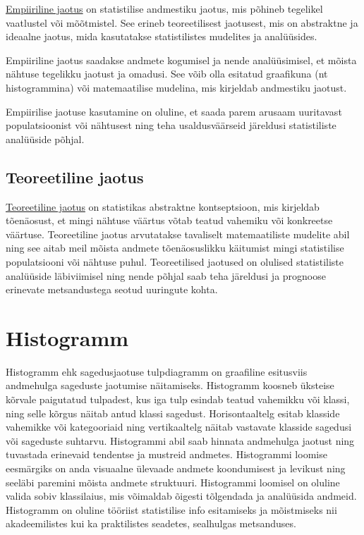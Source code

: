 \documentclass[
]{book}
\begin{document}
\href{https://sonaveeb.ee/search/unif/dlall/aso/empiiriline\%20jaotus/1/est}{Empiiriline jaotus} on statistilise andmestiku jaotus, mis põhineb tegelikel vaatlustel või mõõtmistel. See erineb teoreetilisest jaotusest, mis on abstraktne ja ideaalne jaotus, mida kasutatakse statistilistes mudelites ja analüüsides.

Empiiriline jaotus saadakse andmete kogumisel ja nende analüüsimisel, et mõista nähtuse tegelikku jaotust ja omadusi. See võib olla esitatud graafikuna (nt histogrammina) või matemaatilise mudelina, mis kirjeldab andmestiku jaotust.

Empiirilise jaotuse kasutamine on oluline, et saada parem arusaam uuritavast populatsioonist või nähtusest ning teha usaldusväärseid järeldusi statistiliste analüüside põhjal.

\subsection{Teoreetiline jaotus}\label{teoreetiline-jaotus}

\href{https://sonaveeb.ee/search/unif/dlall/aso/teoreetiline\%20jaotus/1/est}{Teoreetiline jaotus} on statistikas abstraktne kontseptsioon, mis kirjeldab tõenäosust, et mingi nähtuse väärtus võtab teatud vahemiku või konkreetse väärtuse. Teoreetiline jaotus arvutatakse tavaliselt matemaatiliste mudelite abil ning see aitab meil mõista andmete tõenäosuslikku käitumist mingi statistilise populatsiooni või nähtuse puhul. Teoreetilised jaotused on olulised statistiliste analüüside läbiviimisel ning nende põhjal saab teha järeldusi ja prognoose erinevate metsandustega seotud uuringute kohta.

\section{Histogramm}\label{histogramm}

Histogramm ehk sagedusjaotuse tulpdiagramm on graafiline esitusviis andmehulga sageduste jaotumise näitamiseks. Histogramm koosneb üksteise kõrvale paigutatud tulpadest, kus iga tulp esindab teatud vahemikku või klassi, ning selle kõrgus näitab antud klassi sagedust. Horisontaaltelg esitab klasside vahemikke või kategooriaid ning vertikaaltelg näitab vastavate klasside sagedusi või sageduste suhtarvu. Histogrammi abil saab hinnata andmehulga jaotust ning tuvastada erinevaid tendentse ja mustreid andmetes. Histogrammi loomise eesmärgiks on anda visuaalne ülevaade andmete koondumisest ja levikust ning seeläbi paremini mõista andmete struktuuri. Histogrammi loomisel on oluline valida sobiv klassilaius, mis võimaldab õigesti tõlgendada ja analüüsida andmeid. Histogramm on oluline tööriist statistilise info esitamiseks ja mõistmiseks nii akadeemilistes kui ka praktilistes seadetes, sealhulgas metsanduses.
\end{document}

